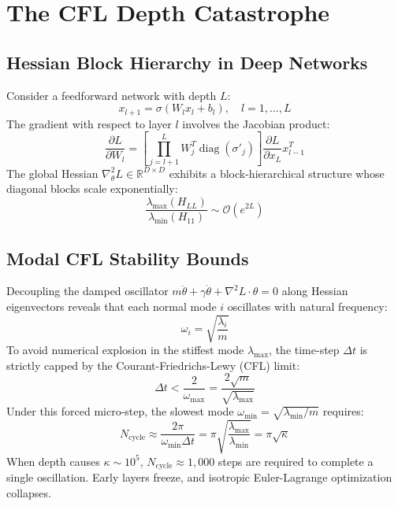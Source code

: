 \documentclass[10pt,twocolumn]{article}
\begin{document}
\section{The CFL Depth Catastrophe}

\subsection{Hessian Block Hierarchy in Deep Networks}

Consider a feedforward network with depth $L$:
\begin{equation}
    x_{l+1} = \sigma(W_l x_l + b_l), \quad l = 1, \dots, L
\end{equation}
The gradient with respect to layer $l$ involves the Jacobian product:
\begin{equation}
    \frac{\partial L}{\partial W_l} = \left[ \prod_{j=l+1}^L W_j^T \operatorname{diag}(\sigma'_j) \right] \frac{\partial L}{\partial x_L} x_{l-1}^T
\end{equation}
The global Hessian $\nabla^2_\theta L \in \mathbb{R}^{D \times D}$ exhibits a block-hierarchical structure whose diagonal blocks scale exponentially:
\begin{equation}
    \frac{\lambda_{\max}(H_{LL})}{\lambda_{\min}(H_{11})} \sim \mathcal{O}(e^{2L})
\end{equation}

\subsection{Modal CFL Stability Bounds}

Decoupling the damped oscillator $m \ddot{\theta} + \gamma \dot{\theta} + \nabla^2 L \cdot \theta = 0$ along Hessian eigenvectors reveals that each normal mode $i$ oscillates with natural frequency:
\begin{equation}
    \omega_i = \sqrt{\frac{\lambda_i}{m}}
\end{equation}
To avoid numerical explosion in the stiffest mode $\lambda_{\max}$, the time-step $\Delta t$ is strictly capped by the Courant-Friedrichs-Lewy (CFL) limit:
\begin{equation}
    \Delta t < \frac{2}{\omega_{\max}} = \frac{2\sqrt{m}}{\sqrt{\lambda_{\max}}}
\end{equation}
Under this forced micro-step, the slowest mode $\omega_{\min} = \sqrt{\lambda_{\min}/m}$ requires:
\begin{equation}
    N_{\text{cycle}} \approx \frac{2\pi}{\omega_{\min} \Delta t} = \pi \sqrt{\frac{\lambda_{\max}}{\lambda_{\min}}} = \pi \sqrt{\kappa}
\end{equation}
When depth causes $\kappa \sim 10^5$, $N_{\text{cycle}} \approx 1,000$ steps are required to complete a single oscillation. Early layers freeze, and isotropic Euler-Lagrange optimization collapses.
\end{document}
